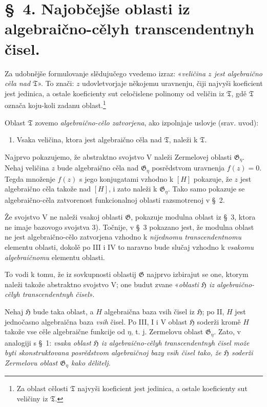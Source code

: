 \documentclass[11pt]{article}
\begin{document}
\section*{\S\ 4. Najobčejše oblasti iz algebraično-cělyh transcendentnyh čisel.}

Za udobnějše formulovanje slědujučego vvedemo izraz:
«{\itshape veličina $z$ jest algebraično cěla nad $\mathfrak T$}». To znači:
$z$ udovletvorjaje někojemu uravnenju, čiji najvyši koeficient jest jedinica, a
ostale koeficienty sut celočislene polinomy od veličin iz $\mathfrak T$, gdě
$\mathfrak T$ označa koju-koli zadanu oblast.\footnote{Za oblast cělosti
$\mathfrak T$ najvyši koeficient jest jedinica, a ostale koeficienty sut
veličiny iz $\mathfrak T$.}

Oblast $\mathfrak T$ zovemo {\itshape algebraično-cělo zatvorjena}, ako
izpolnjaje uslovje (srav. uvod):
\begin{enumerate}
\item[V.] Vsaka veličina, ktora jest algebraično cěla nad $\mathfrak T$, naleži k
$\mathfrak T$.
\end{enumerate}

Najprvo pokazujemo, že abstraktno svojstvo V naleži Zermelovej oblasti
$\mathfrak G_\eta$. Nehaj veličina $z$ bude algebraično cěla nad
$\mathfrak G_\eta$ posrědstvom uravnenja $f(z)=0$. Tegda množenje $f(z)$ s jego
konjugatami vzhodno k $[H]$ pokazuje, že $z$ jest algebraično cěla takože nad
$[H]$, i zato naleži k $\mathfrak G_\eta$. Tako samo pokazuje se
algebraično-cěla zatvorenost funkcionalnoj oblasti razsmotrenoj v \S\ 2.

Že svojstvo V ne naleži vsakoj oblasti $\mathfrak G$, pokazuje modulna oblast
iz \S\ 3, ktora ne imaje bazovogo svojstva 3). Točnije, v \S\ 3 pokazano jest,
že modulna oblast ne jest algebraično-cělo zatvorjena vzhodno k {\itshape
nijednomu transcendentnomu} elementu oblasti, dokolě po III i IV to naravno
bude slučaj vzhodno k {\itshape vsakomu algebraičnomu} elementu oblasti.

To vodi k tomu, že iz sovkupnosti oblastij $\mathfrak G$ najprvo izbirajut se
one, ktorym naleži takože abstraktno svojstvo V; one budut zvane
«{\itshape oblasti $\mathfrak H$ iz algebraično-cělyh transcendentnyh čisel}».

Nehaj $\mathfrak H$ bude taka oblast, a $H$ algebraična baza vsih čisel iz
$\mathfrak H$; po II, $H$ jest jednočasno algebraična baza {\itshape vsih}
čisel. Po III, I i V oblast $\mathfrak H$ soderži kromě $H$ takože vse cěle
algebraične funkcije od $\eta$, t. j. Zermelovu oblast $\mathfrak G_\eta$.
Zato, v analogiji s \S\ 1: {\itshape vsaka oblast $\mathfrak H$ iz
algebraično-cělyh transcendentnyh čisel može byti skonstruktovana posrědstvom
algebraičnoj bazy vsih čisel tako, že $\mathfrak H$ soderži Zermelovu oblast
$\mathfrak G_\eta$ kako dělitelj.}
\end{document}
